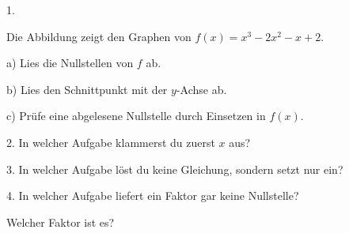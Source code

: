 \documentclass[11pt]{article}
\begin{document}
\pfheftstil
{}

\begin{pfaufg}{}{1.}{}
\begin{minipage}[t]{0.52\linewidth}\vspace{0pt}\raggedright
Die Abbildung zeigt den Graphen von $f(x) = x^3 - 2x^2 - x + 2$.
\par\smallskip
a) Lies die Nullstellen von $f$ ab.\par
b) Lies den Schnittpunkt mit der $y$-Achse ab.\par
c) Prüfe eine abgelesene Nullstelle durch Einsetzen in $f(x)$.
\end{minipage}\hfill
\begin{minipage}[t]{0.44\linewidth}\vspace{0pt}
\end{minipage}
\end{pfaufg}

\begin{pfaufg}{}{2.}{}
In welcher Aufgabe klammerst du zuerst $x$ aus?\par {}
\end{pfaufg}
\begin{pfaufg}{}{3.}{}
In welcher Aufgabe löst du keine Gleichung, sondern setzt nur ein?\par {}
\end{pfaufg}
\begin{pfaufg}{}{4.}{}
In welcher Aufgabe liefert ein Faktor gar keine Nullstelle?\par {}\par
Welcher Faktor ist es? \leerfeld
{}
\end{pfaufg}
\end{document}
